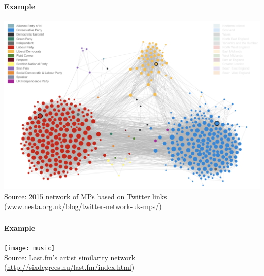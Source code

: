 \documentclass[8pt]{beamer}
\begin{document}
\begin{frame}
\frametitle{\insertsection}
\framesubtitle{Example}
\centering
\includegraphics[width=\linewidth,height=0.8\textheight,keepaspectratio]{mp}\\
\tiny Source: 2015 network of MPs based on Twitter links (\url{www.nesta.org.uk/blog/twitter-network-uk-mps/})
\end{frame}


\begin{frame}
\frametitle{\insertsection}
\framesubtitle{Example}
\centering
\texttt{[image: music]}\\
\tiny Source: Last.fm's artist similarity network (\url{http://sixdegrees.hu/last.fm/index.html})
\end{frame}
\end{document}
